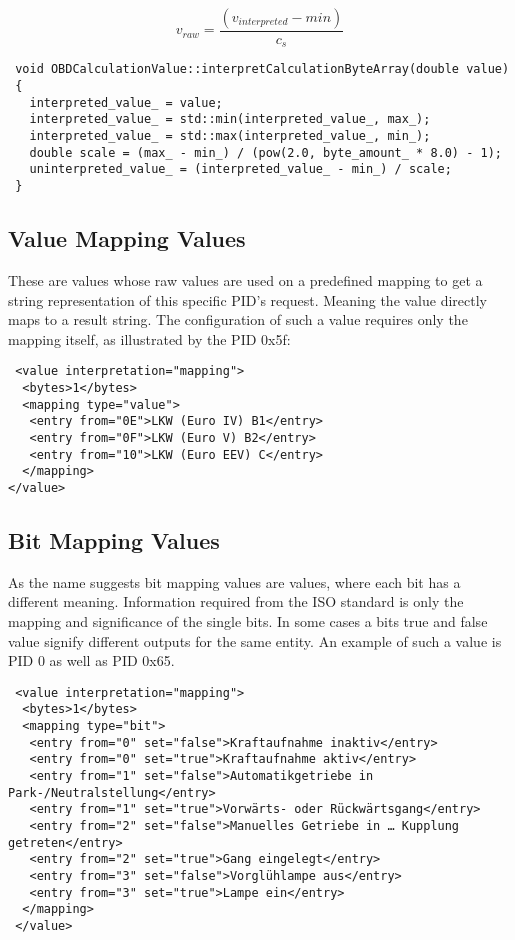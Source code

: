 \[ v_{raw} = \frac{(v_{interpreted} - min)}{c_s} \]

\begin{verbatim}
 void OBDCalculationValue::interpretCalculationByteArray(double value)
 {
   interpreted_value_ = value;
   interpreted_value_ = std::min(interpreted_value_, max_);
   interpreted_value_ = std::max(interpreted_value_, min_);
   double scale = (max_ - min_) / (pow(2.0, byte_amount_ * 8.0) - 1);
   uninterpreted_value_ = (interpreted_value_ - min_) / scale;
 }
\end{verbatim}

\subsection{Value Mapping Values}

These are values whose raw values are used on a predefined mapping to get a string representation of this specific PID’s request. Meaning the 
value directly maps to a result string. The configuration of such a value requires only the mapping itself, as illustrated by the PID 0x5f:

\begin{verbatim}
 <value interpretation="mapping">
  <bytes>1</bytes>
  <mapping type="value">
   <entry from="0E">LKW (Euro IV) B1</entry>
   <entry from="0F">LKW (Euro V) B2</entry>
   <entry from="10">LKW (Euro EEV) C</entry>
  </mapping>        
</value>
\end{verbatim}

\subsection{Bit Mapping Values}

As the name suggests bit mapping values are values, where each bit has a different meaning. Information required from the ISO standard is only
the mapping and significance of the single bits. In some cases a bits true and false value signify different outputs for the same entity. An 
example of such a value is PID 0 as well as PID 0x65.

\begin{verbatim}
 <value interpretation="mapping">
  <bytes>1</bytes>
  <mapping type="bit">
   <entry from="0" set="false">Kraftaufnahme inaktiv</entry>
   <entry from="0" set="true">Kraftaufnahme aktiv</entry>
   <entry from="1" set="false">Automatikgetriebe in Park-/Neutralstellung</entry>
   <entry from="1" set="true">Vorwärts- oder Rückwärtsgang</entry>
   <entry from="2" set="false">Manuelles Getriebe in … Kupplung getreten</entry>
   <entry from="2" set="true">Gang eingelegt</entry>
   <entry from="3" set="false">Vorglühlampe aus</entry>
   <entry from="3" set="true">Lampe ein</entry>
  </mapping>
 </value>
\end{verbatim}

